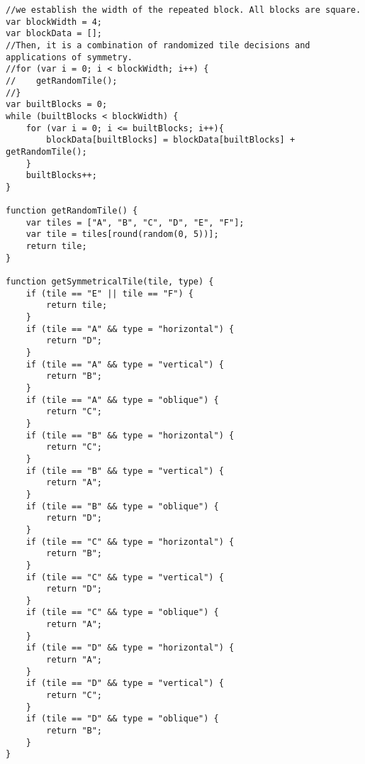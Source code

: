 \begin{lstlisting}
//we establish the width of the repeated block. All blocks are square.
var blockWidth = 4;
var blockData = [];
//Then, it is a combination of randomized tile decisions and applications of symmetry.
//for (var i = 0; i < blockWidth; i++) {
//    getRandomTile();
//}
var builtBlocks = 0;
while (builtBlocks < blockWidth) {
    for (var i = 0; i <= builtBlocks; i++){
        blockData[builtBlocks] = blockData[builtBlocks] + getRandomTile();
    }
    builtBlocks++;
}

function getRandomTile() {
    var tiles = ["A", "B", "C", "D", "E", "F"];
    var tile = tiles[round(random(0, 5))];
    return tile;
}

function getSymmetricalTile(tile, type) {
    if (tile == "E" || tile == "F") {
        return tile;
    }
    if (tile == "A" && type = "horizontal") {
        return "D";
    }
    if (tile == "A" && type = "vertical") {
        return "B";
    }
    if (tile == "A" && type = "oblique") {
        return "C";
    }
    if (tile == "B" && type = "horizontal") {
        return "C";
    }
    if (tile == "B" && type = "vertical") {
        return "A";
    }
    if (tile == "B" && type = "oblique") {
        return "D";
    }
    if (tile == "C" && type = "horizontal") {
        return "B";
    }
    if (tile == "C" && type = "vertical") {
        return "D";
    }
    if (tile == "C" && type = "oblique") {
        return "A";
    }
    if (tile == "D" && type = "horizontal") {
        return "A";
    }
    if (tile == "D" && type = "vertical") {
        return "C";
    }
    if (tile == "D" && type = "oblique") {
        return "B";
    }
}

\end{lstlisting}
